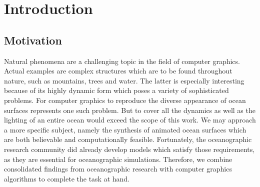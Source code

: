 \chapter{Introduction}
\label{ch:intro}
%
\section{Motivation}
\label{sec:motivation}
Natural phenomena are a challenging topic in the field of computer graphics.
Actual examples are complex structures which are to be found throughout nature,
such as mountains, trees and water. The latter is especially interesting
because of its highly dynamic form which poses a variety of sophisticated problems.
For computer graphics to reproduce the diverse appearance of ocean surfaces
represents one such problem. But to cover all the dynamics as well
as the lighting of an entire ocean would exceed the scope of this work.
We may approach a more specific subject, namely the synthesis of animated ocean
surfaces which are both believable and computationally feasible.
Fortunately, the oceanographic research community did already develop models
which satisfy those requirements, as they are essential for oceanographic
simulations. Therefore, we combine consolidated findings from oceanographic
research with computer graphics algorithms to complete the task at hand.
%
%
%
%
% 
% 
% 
%
